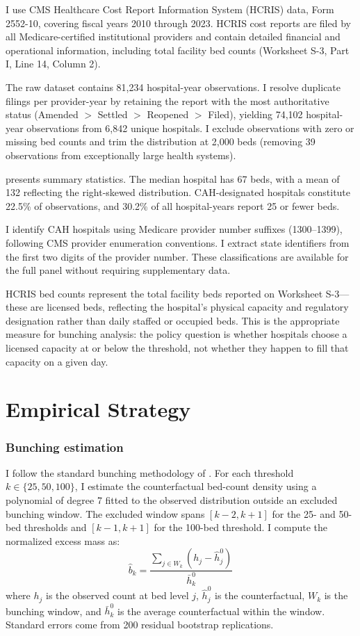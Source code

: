 \documentclass[12pt]{article}
\begin{document}
I use CMS Healthcare Cost Report Information System (HCRIS) data, Form 2552-10, covering fiscal years 2010 through 2023. HCRIS cost reports are filed by all Medicare-certified institutional providers and contain detailed financial and operational information, including total facility bed counts (Worksheet S-3, Part I, Line 14, Column 2).

The raw dataset contains 81,234 hospital-year observations. I resolve duplicate filings per provider-year by retaining the report with the most authoritative status (Amended $>$ Settled $>$ Reopened $>$ Filed), yielding 74,102 hospital-year observations from 6,842 unique hospitals. I exclude observations with zero or missing bed counts and trim the distribution at 2,000 beds (removing 39 observations from exceptionally large health systems).

 presents summary statistics. The median hospital has 67 beds, with a mean of 132 reflecting the right-skewed distribution. CAH-designated hospitals constitute 22.5\% of observations, and 30.2\% of all hospital-years report 25 or fewer beds.



I identify CAH hospitals using Medicare provider number suffixes (1300--1399), following CMS provider enumeration conventions. I extract state identifiers from the first two digits of the provider number. These classifications are available for the full panel without requiring supplementary data.

HCRIS bed counts represent the total facility beds reported on Worksheet S-3---these are licensed beds, reflecting the hospital's physical capacity and regulatory designation rather than daily staffed or occupied beds. This is the appropriate measure for bunching analysis: the policy question is whether hospitals choose a licensed capacity at or below the threshold, not whether they happen to fill that capacity on a given day.

\section{Empirical Strategy}

\subsubsection*{Bunching estimation}  I follow the standard bunching methodology of \citet{kleven2016}. For each threshold $k \in \{25, 50, 100\}$, I estimate the counterfactual bed-count density using a polynomial of degree 7 fitted to the observed distribution outside an excluded bunching window. The excluded window spans $[k-2, k+1]$ for the 25- and 50-bed thresholds and $[k-1, k+1]$ for the 100-bed threshold. I compute the normalized excess mass as:
\[
\hat{b}_k = \frac{\sum_{j \in W_k} (h_j - \hat{h}^0_j)}{\bar{h}^0_k}
\]
where $h_j$ is the observed count at bed level $j$, $\hat{h}^0_j$ is the counterfactual, $W_k$ is the bunching window, and $\bar{h}^0_k$ is the average counterfactual within the window. Standard errors come from 200 residual bootstrap replications.
\end{document}
